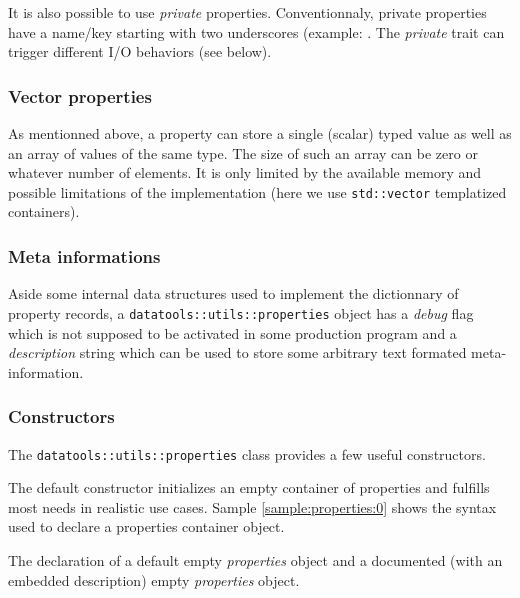 It is also possible to use \emph{private} properties.  Conventionnaly,
private  properties  have  a  name/key starting  with  two  underscores
(example: . The \emph{private} trait can trigger different
I/O behaviors (see below).

\subsubsection{Vector properties}

As mentionned above, a property can store a single (scalar) typed value
as well as an array of values of the same type. The size of such an array
can be zero or whatever number of elements. It is only limited
by the available memory and possible limitations of the implementation
(here we use \texttt{std::vector} templatized containers).

\subsubsection{Meta informations}

Aside some internal data structures used to implement the dictionnary
of property records, a \texttt{datatools::utils::properties} object
has a \emph{debug} flag which is not supposed to be activated in some production
program and a \emph{description} string which can be used to store
some  arbitrary text formated meta-information.


\subsubsection{Constructors}

The \texttt{datatools::utils::properties} class provides a few useful
constructors.

The default  constructor initializes an empty  container of properties
and   fulfills   most   needs   in   realistic   use   cases.   Sample
\ref{sample:properties:0}   shows  the  syntax   used  to   declare  a
properties container object.

\begin{sample}[h]
\caption{The declaration of a default empty \emph{properties}
object and a documented (with an embedded description) empty \emph{properties}
object.}
\label{sample:properties:0}
\end{sample}


